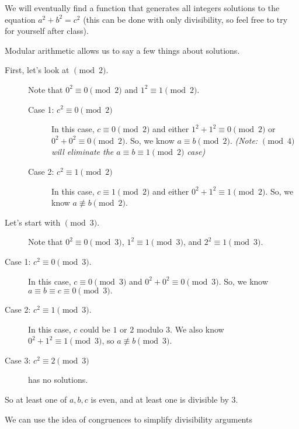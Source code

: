 \documentclass[letterpaper, 11 pt]{ximera}
\begin{document}
\begin{example}
 We will eventually find a function that generates all integers solutions to the equation $a^2+b^2=c^2$ (this can be done with only divisibility, so feel free to try for yourself after class).
 
 Modular arithmetic allows us to say a few things about solutions. 
 \begin{description}
 \item[First, let's look at $\!\pmod 2$.] Note that $0^2\equiv 0 \pmod 2$ and $1^2\equiv 1 \pmod 2$.

\begin{description}
 \item[Case 1: $c^2\equiv 0 \pmod 2$] In this case, $c\equiv 0\pmod 2$ and either $1^2+1^2\equiv 0\pmod 2$ or $0^2+0^2\equiv 0\pmod 2$. So, we know $a\equiv b\pmod 2.$ \emph{(Note: $\!\pmod 4$ will eliminate the $a\equiv b\equiv 1 \pmod 2$ case)}
  \item[Case 2: $c^2\equiv 1 \pmod 2$] In this case, $c\equiv 1\pmod 2$ and either $0^2+1^2\equiv 1\pmod 2$. So, we know $a\not\equiv b\pmod 2.$
\end{description}

\item[Let's start with $\!\pmod 3$.] Note that $0^2\equiv 0 \pmod 3$, $1^2\equiv 1 \pmod 3$, and $2^2\equiv 1 \pmod 3$.
\end{description} 

\begin{description}
 \item[Case 1: $c^2\equiv 0 \pmod 3$.] In this case, $c\equiv 0\pmod 3$ and $0^2+0^2\equiv 0\pmod 3$. So, we know $a\equiv b\equiv c\equiv 0\pmod 3.$ 
  \item[Case 2: $c^2\equiv 1 \pmod 3$.] In this case, $c$ could be $1$ or $2$ modulo $3$. We also know $0^2+1^2\equiv 1\pmod 3$, so  $a\not\equiv b\pmod 3.$
  \item[Case 3: $c^2\equiv 2 \pmod 3$] has no solutions.
\end{description}

So at least one of $a,b,c$ is even, and at least one is divisible by $3$.
\end{example}

We can use the idea of congruences to simplify divisibility arguments
\end{document}
